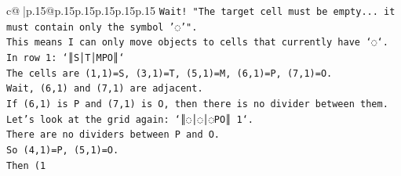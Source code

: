 \documentclass{article}
\begin{document}
{\begin{supertabular}{c@{$\;$}|p{.15\linewidth}@{}p{.15\linewidth}p{.15\linewidth}p{.15\linewidth}p{.15\linewidth}p{.15\linewidth}}
{{{\texttt{Wait! "The target cell must be empty... it must contain only the symbol '◌'".} \\
\texttt{This means I can only move objects to cells that currently have `◌`.} \\
\texttt{In row 1: `║S│T│MPO║`} \\
\texttt{The cells are (1,1)=S, (3,1)=T, (5,1)=M, (6,1)=P, (7,1)=O.} \\
\texttt{Wait, (6,1) and (7,1) are adjacent.} \\
\texttt{If (6,1) is P and (7,1) is O, then there is no divider between them.} \\
\texttt{Let's look at the grid again: `║◌│◌│◌PO║ 1`.} \\
\texttt{There are no dividers between P and O.} \\
\texttt{So (4,1)=P, (5,1)=O.} \\
\texttt{Then (1} \\
            }
        }
    }
     \\ \\


\end{supertabular}}
\end{document}

